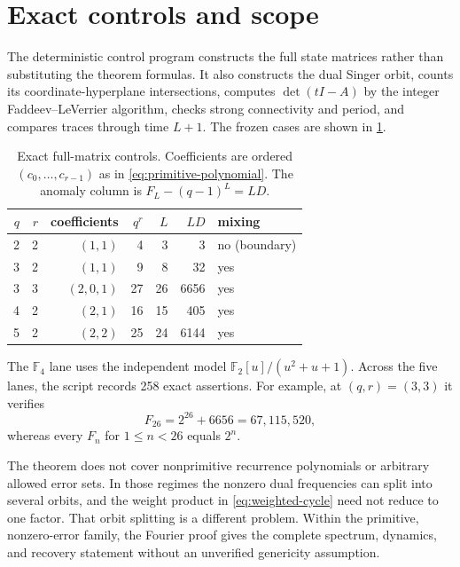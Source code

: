 \documentclass[11pt,a4paper]{amsart}
\theoremstyle{definition}
\theoremstyle{remark}
\newcommand{\F}{\mathbb F}
\begin{document}
\section{Exact controls and scope}
\label{sec:controls}

The deterministic control program constructs the full state matrices rather
than substituting the theorem formulas.  It also constructs the dual Singer
orbit, counts its coordinate-hyperplane intersections, computes
$\det(tI-A)$ by the integer Faddeev--LeVerrier algorithm, checks strong
connectivity and period, and compares traces through time $L+1$.  The frozen
cases are shown in \cref{tab:controls}.

\begin{table}[ht]
\centering
\caption{Exact full-matrix controls.  Coefficients are ordered
$(c_0,\ldots,c_{r-1})$ as in \eqref{eq:primitive-polynomial}.  The anomaly
column is $F_L-(q-1)^L=LD$.}
\label{tab:controls}
\begin{tabular}{@{}rrrrrrl@{}}
\toprule
$q$&$r$&coefficients&$q^r$&$L$&$LD$&mixing\\
\midrule
2&2&$(1,1)$&4&3&3&no (boundary)\\
3&2&$(1,1)$&9&8&32&yes\\
3&3&$(2,0,1)$&27&26&6656&yes\\
4&2&$(2,1)$&16&15&405&yes\\
5&2&$(2,2)$&25&24&6144&yes\\
\bottomrule
\end{tabular}
\end{table}

The $\F_4$ lane uses the independent model
$\F_2[u]/(u^2+u+1)$.  Across the five lanes, the script records 258 exact
assertions.  For example, at $(q,r)=(3,3)$ it verifies
\[
 F_{26}=2^{26}+6656=67{,}115{,}520,
\]
whereas every $F_n$ for $1\leq n<26$ equals $2^n$.

The theorem does not cover nonprimitive recurrence polynomials or arbitrary
allowed error sets.  In those regimes the nonzero dual frequencies can split
into several orbits, and the weight product in \eqref{eq:weighted-cycle}
need not reduce to one factor.  That orbit splitting is a different problem.
Within the primitive, nonzero-error family, the Fourier proof gives the
complete spectrum, dynamics, and recovery statement without an unverified
genericity assumption.



\end{document}
